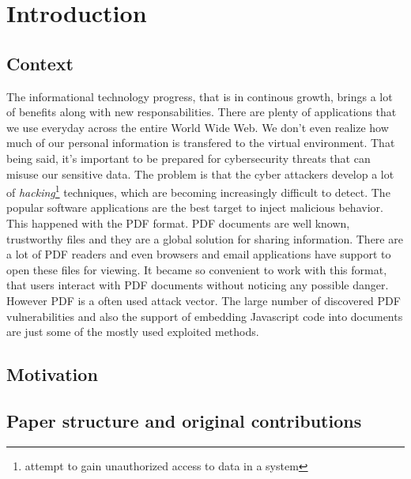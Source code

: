 \chapter{Introduction}
\label{chapter:introduction}

\section{Context}
\label{section:context} 
The informational technology progress, that is in continous growth, brings a lot of benefits along with new responsabilities. There are plenty of applications that we use everyday across the entire World Wide Web. We don't even realize how much of our personal information is transfered to the virtual environment. That being said, it's important to be prepared for cybersecurity threats that can misuse our sensitive data. The problem is that the cyber attackers develop a lot of \textit{hacking}\footnote{attempt to gain unauthorized access to data in a system} techniques, which are becoming increasingly difficult to detect. The popular software applications are the best target to inject malicious behavior. This happened with the PDF format. PDF documents are well known, trustworthy files and they are a global solution for sharing information. There are a lot of PDF readers and even browsers and email applications have support to open these files for viewing. It became so convenient to work with this format, that users interact with PDF documents without noticing any possible danger. However PDF is a often used attack vector. The large number of discovered PDF vulnerabilities and also the support of embedding Javascript code into documents are just some of the mostly used exploited methods.


\section{Motivation}
\label{section:motivation} 


\section{Paper structure and original contributions}
\label{section:structure}

